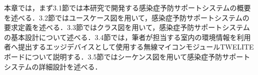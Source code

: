 
本章では，まず3.1節では本研究で開発する感染症予防サポートシステムの概要を述べる．3.2節ではユースケース図を用いて，感染症予防サポートシステムの要求定義を述べる．3.3節ではクラス図を用いて，感染症予防サポートシステムの基本設計について述べる．3.4節では，筆者が担当する室内の環境情報を利用者へ提出するエッジデバイスとして使用する無線マイコンモジュールTWELITEボードについて説明する．3.5節ではシーケンス図を用いて感染症予防サポートシステムの詳細設計を述べる．


